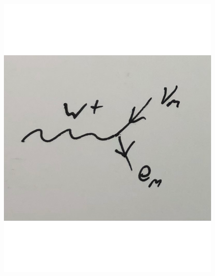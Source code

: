\documentclass[
	11pt, %
]{beamer}
\begin{document}
\begin{frame}
\begin{itemize}
\begin{figure}[h!]
\end{figure}
\begin{figure}[h!]
	\vspace*{-3cm}
	 \hspace*{-7cm}
	\includegraphics[scale=.1]{nu_e.pdf}
\end{figure}
\begin{figure}
	\vspace*{-3cm}
	 \hspace*{0cm}

\end{figure}
\end{itemize}
\end{frame}
\end{document}
